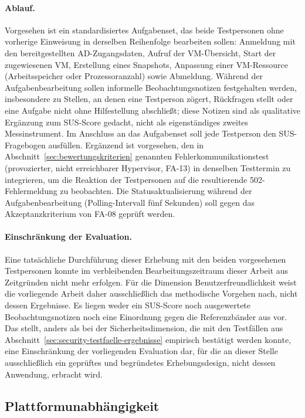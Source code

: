 \documentclass[12pt,a4paper]{article}
\begin{document}
\paragraph{Ablauf.} Vorgesehen ist ein standardisiertes Aufgabenset, das beide Testpersonen ohne vorherige Einweisung in derselben Reihenfolge bearbeiten sollen: Anmeldung mit den bereitgestellten AD-Zugangsdaten, Aufruf der VM-Übersicht, Start der zugewiesenen VM, Erstellung eines Snapshots, Anpassung einer VM-Ressource (Arbeitsspeicher oder Prozessoranzahl) sowie Abmeldung. Während der Aufgabenbearbeitung sollen informelle Beobachtungsnotizen festgehalten werden, insbesondere zu Stellen, an denen eine Testperson zögert, Rückfragen stellt oder eine Aufgabe nicht ohne Hilfestellung abschließt; diese Notizen sind als qualitative Ergänzung zum SUS-Score gedacht, nicht als eigenständiges zweites Messinstrument. Im Anschluss an das Aufgabenset soll jede Testperson den SUS-Fragebogen ausfüllen. Ergänzend ist vorgesehen, den in Abschnitt~\ref{sec:bewertungskriterien} genannten Fehlerkommunikationstest (provozierter, nicht erreichbarer Hypervisor, FA-13) in denselben Testtermin zu integrieren, um die Reaktion der Testpersonen auf die resultierende 502-Fehlermeldung zu beobachten. Die Statusaktualisierung während der Aufgabenbearbeitung (Polling-Intervall fünf Sekunden) soll gegen das Akzeptanzkriterium von FA-08 geprüft werden.

\paragraph{Einschränkung der Evaluation.} Eine tatsächliche Durchführung dieser Erhebung mit den beiden vorgesehenen Testpersonen konnte im verbleibenden Bearbeitungszeitraum dieser Arbeit aus Zeitgründen nicht mehr erfolgen. Für die Dimension Benutzerfreundlichkeit weist die vorliegende Arbeit daher ausschließlich das methodische Vorgehen nach, nicht dessen Ergebnisse. Es liegen weder ein SUS-Score noch ausgewertete Beobachtungsnotizen noch eine Einordnung gegen die Referenzbänder aus \parencite{bangor2008sus} vor. Das stellt, anders als bei der Sicherheitsdimension, die mit den Testfällen aus Abschnitt~\ref{sec:security-testfaelle-ergebnisse} empirisch bestätigt werden konnte, eine Einschränkung der vorliegenden Evaluation dar, für die an dieser Stelle ausschließlich ein geprüftes und begründetes Erhebungsdesign, nicht dessen Anwendung, erbracht wird.

\subsection{Plattformunabhängigkeit}
\label{sec:eval-plattform}
\end{document}
